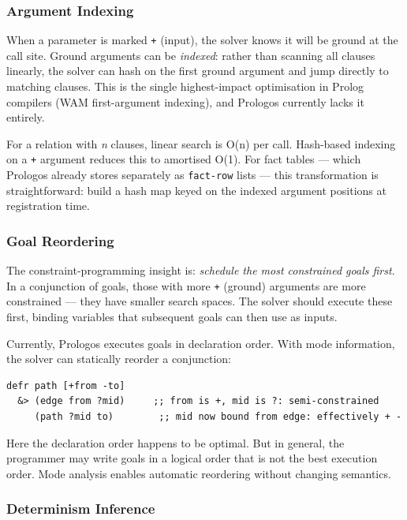 \documentclass[11pt]{article}
\begin{document}
\subsubsection{Argument Indexing}
\label{sec:org4b18ead}

When a parameter is marked \texttt{+} (input), the solver knows it will be ground at
the call site. Ground arguments can be \emph{indexed}: rather than scanning all
clauses linearly, the solver can hash on the first ground argument and jump
directly to matching clauses. This is the single highest-impact optimisation in
Prolog compilers (WAM first-argument indexing), and Prologos currently lacks it
entirely.

For a relation with \emph{n} clauses, linear search is O(n) per call. Hash-based
indexing on a \texttt{+} argument reduces this to amortised O(1). For fact tables ---
which Prologos already stores separately as \texttt{fact-row} lists --- this
transformation is straightforward: build a hash map keyed on the indexed
argument positions at registration time.
\subsubsection{Goal Reordering}
\label{sec:org0d9a300}

The constraint-programming insight is: \emph{schedule the most constrained goals
first}. In a conjunction of goals, those with more \texttt{+} (ground) arguments are
more constrained --- they have smaller search spaces. The solver should execute
these first, binding variables that subsequent goals can then use as inputs.

Currently, Prologos executes goals in declaration order. With mode information,
the solver can statically reorder a conjunction:

\begin{verbatim}
defr path [+from -to]
  &> (edge from ?mid)     ;; from is +, mid is ?: semi-constrained
     (path ?mid to)        ;; mid now bound from edge: effectively + -
\end{verbatim}

Here the declaration order happens to be optimal. But in general, the programmer
may write goals in a logical order that is not the best execution order. Mode
analysis enables automatic reordering without changing semantics.
\subsubsection{Determinism Inference}
\label{sec:org96df512}
\end{document}
